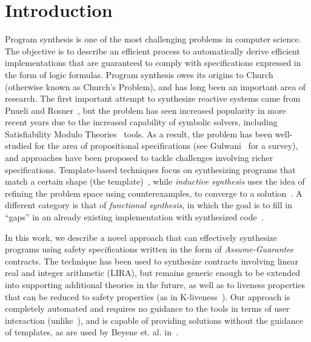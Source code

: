 
\section{Introduction}

Program synthesis is one of the most challenging problems in computer science. The objective is to describe an efficient process to automatically derive efficient implementations that are guaranteed to comply with specifications expressed in the form of logic formulas. Program synthesis owes its origins to Church~\cite{church1962logic} (otherwise known as Church's Problem), and has long been an important area of research.
%
%
The first important attempt to synthesize reactive systems came from Pnueli and Rosner~\cite{pnueli1989synthesis}, but the problem has seen increased popularity in more recent years due to the increased capability of symbolic solvers, including Satisfiability Modulo Theories~\cite{BarFT-SMTLIB} tools. As a result, the problem has been well-studied for the area of propositional specifications (see Gulwani~\cite{gulwani2010dimensions} for a survey), and approaches have been proposed to tackle challenges involving richer specifications. Template-based techniques focus on synthesizing programs that
match a certain shape (the template)~\cite{srivastava2013template}, while {\em inductive synthesis} uses the idea of refining the problem space using counterexamples, to converge to a solution~\cite{flener2001inductive}. A different category is that of \textit{functional synthesis}, in which the goal is to fill in ``gaps'' in an already existing implementation with synthesized code~\cite{kuncak2013functional}.

In this work, we describe a novel approach that can effectively synthesize
programs using safety specifications written in the form of {\em
Assume-Guarantee} contracts. The technique has been used to synthesize contracts involving linear real and integer arithmetic (LIRA),
but remains generic enough to be extended into supporting additional theories
in the future, as well as to liveness properties that can be reduced to safety properties (as in K-liveness~\cite{claessen2012liveness}).  Our approach is completely automated and requires no guidance to the tools in terms of user interaction (unlike~\cite{ryzhyk2014user,ryzhyk2016developing}), and is capable of providing solutions without the guidance of templates, as are used by Beyene et. al.
in~\cite{beyene2014constraint}.

